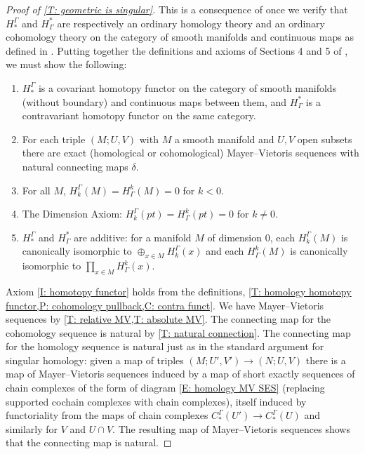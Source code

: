 \begin{proof}[Proof of \cref{T: geometric is singular}]
	This is a consequence of \cite[Proposition 10]{Krec10b} once we verify that $H_*^\Gamma$ and $H^*_\Gamma$ are respectively an ordinary homology theory and an ordinary cohomology theory on the category of smooth manifolds and continuous maps as defined in \cite{Krec10b}.
	Putting together the definitions and axioms of Sections 4 and 5 of \cite{Krec10b}, we must show the following:

	\begin{enumerate}
		\item\label{I: homotopy functor} $H_*^\Gamma$ is a covariant homotopy functor on the category of smooth manifolds (without boundary) and continuous maps between them, and $H^*_\Gamma$ is a contravariant homotopy functor on the same category.

		\item For each triple $(M;U,V)$ with $M$ a smooth manifold and $U,V$ open subsets there are exact (homological or cohomological) Mayer--Vietoris sequences with natural connecting maps $\delta$.

		\item\label{I: neg dim} For all $M$, $H_k^\Gamma(M) = H^k_\Gamma(M) = 0$ for $k<0$.

		\item The Dimension Axiom: $H_k^\Gamma(pt) = H^k_\Gamma(pt) = 0$ for $k\neq 0$.

		\item $H_*^\Gamma$ and $H^*_\Gamma$ are additive: for a manifold $M$ of dimension $0$, each $H_k^\Gamma(M)$ is canonically isomorphic to $\oplus_{x \in M} H_k^\Gamma(x)$ and each $H^k_\Gamma(M)$ is canonically isomorphic to $\prod_{x \in M} H^k_\Gamma(x)$.
	\end{enumerate}

	Axiom \ref{I: homotopy functor} holds from the definitions, \cref{T: homology homotopy functor,P: cohomology pullback,C: contra funct}.
	We have Mayer--Vietoris sequences by \cref{T: relative MV,T: absolute MV}.
	The connecting map for the cohomology sequence is natural by \cref{T: natural connection}.
	The connecting map for the homology sequence is natural just as in the standard argument for singular homology: given a map of triples $(M;U',V') \to (N;U,V)$ there is a map of Mayer--Vietoris sequences induced by a map of short exactly sequences of chain complexes of the form of diagram \eqref{E: homology MV SES} (replacing supported cochain complexes with chain complexes), itself induced by functoriality from the maps of chain complexes $C_*^{\Gamma}(U') \to C_*^{\Gamma}(U)$ and similarly for $V$ and $U \cap V$.
	The resulting map of Mayer--Vietoris sequences shows that the connecting map is natural.


\end{proof}
